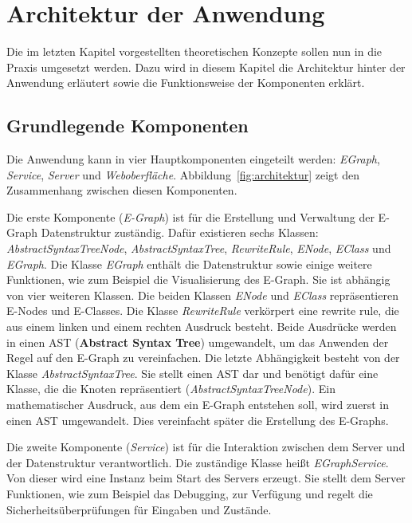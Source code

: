 \section{Architektur der Anwendung}\label{sec:architektur}

Die im letzten Kapitel vorgestellten theoretischen Konzepte sollen nun in die Praxis umgesetzt werden.
Dazu wird in diesem Kapitel die Architektur hinter der Anwendung erläutert sowie die Funktionsweise der Komponenten erklärt.

\subsection{Grundlegende Komponenten}

Die Anwendung kann in vier Hauptkomponenten eingeteilt werden: \textit{EGraph}, \textit{Service}, \textit{Server} und \textit{Weboberfläche}.
Abbildung~\ref{fig:architektur} zeigt den Zusammenhang zwischen diesen Komponenten. 

Die erste Komponente (\textit{E-Graph}) ist für die Erstellung und Verwaltung der E-Graph Datenstruktur zuständig. Dafür existieren sechs Klassen:
\textit{AbstractSyntaxTreeNode}, \textit{AbstractSyntaxTree}, \textit{RewriteRule}, \textit{ENode}, \textit{EClass} und \textit{EGraph}.
Die Klasse \textit{EGraph} enthält die Datenstruktur sowie einige weitere Funktionen, wie zum Beispiel die Visualisierung des E-Graph.
Sie ist abhängig von vier weiteren Klassen. Die beiden Klassen \textit{ENode} und \textit{EClass} repräsentieren E-Nodes und E-Classes.
Die Klasse \textit{RewriteRule} verkörpert eine rewrite rule, die aus einem linken und einem rechten Ausdruck besteht. Beide Ausdrücke werden in einen AST (\textbf{Abstract Syntax Tree}) umgewandelt, 
um das Anwenden der Regel auf den E-Graph zu vereinfachen.
Die letzte Abhängigkeit besteht von der Klasse \textit{AbstractSyntaxTree}. Sie stellt einen AST dar und benötigt dafür eine Klasse, 
die die Knoten repräsentiert (\textit{AbstractSyntaxTreeNode}).
Ein mathematischer Ausdruck, aus dem ein E-Graph entstehen soll, wird zuerst in einen AST umgewandelt. Dies vereinfacht später die Erstellung des E-Graphs.

Die zweite Komponente (\textit{Service}) ist für die Interaktion zwischen dem Server und der Datenstruktur verantwortlich. Die zuständige Klasse heißt \textit{EGraphService}. 
Von dieser wird eine Instanz beim Start des Servers erzeugt. 
Sie stellt dem Server Funktionen, wie zum Beispiel das Debugging, zur Verfügung und regelt die Sicherheitsüberprüfungen für Eingaben und Zustände. 

